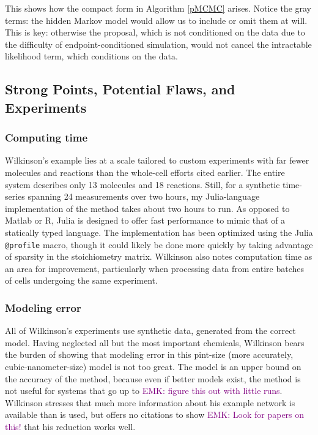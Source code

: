 \documentclass{article}
\newcommand\EMK[1]{\textcolor{purple}{EMK: #1}}
\begin{document}
This shows how the compact form in Algorithm \ref{pMCMC} arises. Notice the gray terms: the hidden Markov model would allow us to include or omit them at will. This is key: otherwise the proposal, which is not conditioned on the data due to the difficulty of endpoint-conditioned simulation, would not cancel the intractable likelihood term, which conditions on the data. %

\subsection{Strong Points, Potential Flaws, and Experiments}
\subsubsection{Computing time}
Wilkinson's example lies at a scale tailored to custom experiments with far fewer molecules and reactions than the whole-cell efforts cited earlier. The entire system describes only 13 molecules and 18 reactions. Still, for a synthetic time-series spanning 24 measurements over two hours, my Julia-language implementation of the method takes about two hours to run. As opposed to Matlab or R, Julia is designed to offer fast performance to mimic that of a statically typed language. The implementation has been optimized using the Julia \texttt{@profile} macro, though it could likely be done more quickly by taking advantage of sparsity in the stoichiometry matrix. Wilkinson also notes computation time as an area for improvement, particularly when processing data from entire batches of cells undergoing the same experiment.

\subsubsection{Modeling error}
All of Wilkinson's experiments use synthetic data, generated from the correct model. Having neglected all but the most important chemicals, Wilkinson bears the burden of showing that modeling error in this pint-size (more accurately, cubic-nanometer-size) model is not too great. The model is an upper bound on the accuracy of the method, because even if better models exist, the method is not useful for systems that go up to \EMK{figure this out with little runs}. Wilkinson stresses that much more information about his example network is available than is used, but offers no citations to show \EMK{Look for papers on this!} that his reduction works well.
\end{document}
